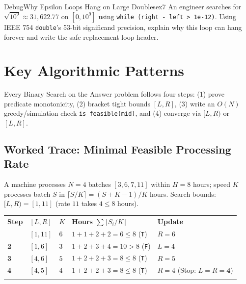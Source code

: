 \documentclass[11pt,a4paper]{article}
\theoremstyle{definition}
\begin{document}
\begin{tryitbox}{Debug}{Why Epsilon Loops Hang on Large Doubles}{ex7}
An engineer searches for $\sqrt{10^9} \approx 31{,}622.77$ on $[0, 10^9]$ using \texttt{while (right - left > 1e-12)}. Using IEEE 754 \texttt{double}'s 53-bit significand precision, explain why this loop can hang forever and write the safe replacement loop header.
\end{tryitbox}

\section{Key Algorithmic Patterns}

Every Binary Search on the Answer problem follows four steps: (1) prove predicate monotonicity, (2) bracket tight bounds $[L, R]$, (3) write an $O(N)$ greedy/simulation check \texttt{is\_feasible(mid)}, and (4) converge via $[L, R)$ or $[L, R]$.

\subsection{Worked Trace: Minimal Feasible Processing Rate}

A machine processes $N = 4$ batches $[3, 6, 7, 11]$ within $H = 8$ hours; speed $K$ processes batch $S$ in $\lceil S / K \rceil = (S + K - 1) / K$ hours. Search bounds: $[L, R) = [1, 11]$ (rate $11$ takes $4 \le 8$ hours).

\begin{center}
\begingroup\footnotesize{}
\begin{tabularx}{\textwidth}{>{\centering\arraybackslash\bfseries}p{1.0cm} >{\centering\arraybackslash}p{1.8cm} >{\centering\arraybackslash}p{1.2cm} >{\raggedright\arraybackslash}X >{\raggedright\arraybackslash}p{3.0cm}}
\arrayrulecolor{primaryblue}\toprule[1.1pt]
\rowcolor{primaryblue!10}
\textcolor{primaryblue}{\textbf{Step}} & \textcolor{primaryblue}{\textbf{$[L, R]$}} & \textcolor{primaryblue}{\textbf{$K$}} & \textcolor{primaryblue}{\textbf{Hours $\sum \lceil S_i / K \rceil$}} & \textcolor{primaryblue}{\textbf{Update}} \\
\arrayrulecolor{codeframe}\midrule[0.6pt]
1 & $[1, 11]$ & $6$ & $1 + 1 + 2 + 2 = 6 \le 8$ (\texttt{T}) & $R = 6$ \\
2 & $[1, 6]$ & $3$ & $1 + 2 + 3 + 4 = 10 > 8$ (\texttt{F}) & $L = 4$ \\
3 & $[4, 6]$ & $5$ & $1 + 2 + 2 + 3 = 8 \le 8$ (\texttt{T}) & $R = 5$ \\
4 & $[4, 5]$ & $4$ & $1 + 2 + 2 + 3 = 8 \le 8$ (\texttt{T}) & $R = 4$ (Stop: $L = R = \mathbf{4}$) \\
\arrayrulecolor{primaryblue}\bottomrule[1.1pt]
\end{tabularx}\endgroup
\end{center}
\end{document}
